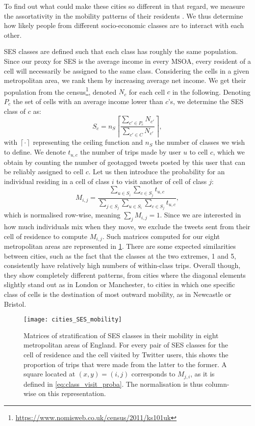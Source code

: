 \documentclass[../thesis.tex]{subfiles}
\begin{document}
To find out what could make these cities so different in that regard, we measure the
assortativity in the mobility patterns of their residents
\cite{HilmanSocioeconomicBiases2022}. We thus determine how likely people from different
socio-economic classes are to interact with each other.

\Ac{SES} classes are defined such that each class has roughly the same population. Since
our proxy for \ac{SES} is the average income in every \ac{MSOA}, every resident of a
cell will necessarily be assigned to the same class. Considering the cells in a given
metropolitan area, we rank them by increasing average net income. We get their
population from the
census\footnote{\url{https://www.nomisweb.co.uk/census/2011/ks101uk}}, denoted $N_c$ for
each cell $c$ in the following. Denoting $P_c$ the set of cells with an average income
lower than $c$'s, we determine the \ac{SES} class of $c$ as:
\begin{equation}
  S_c = n_S \left\lceil \frac{\sum_{c' \in P_c} N_{c'}}{\sum_{c' \in C} N_{c'}} \right\rceil,
\end{equation}
with $\left\lceil \cdot \right\rceil$ representing the ceiling function and $n_S$ the
number of classes we wish to define. We denote $t_{u, c}$ the number of trips made by
user $u$ to cell $c$, which we obtain by counting the number of geotagged tweets posted
by this user that can be reliably assigned to cell $c$. Let us then introduce the
probability for an individual residing in a cell of class $i$ to visit another of cell
of class $j$:
\begin{equation}
  \label{eq:class_visit_proba}
  M_{i, j} = \frac{
      \sum_{u \in S_i} \sum_{c \in S_j} t_{u, c}
    }{
      \sum_{j \in S_j} \sum_{u \in S_i} \sum_{c \in S_j} t_{u, c}
    },
\end{equation}
which is normalised row-wise, meaning $\sum_j M_{i, j} = 1$. Since we are interested in
how much individuals mix when they move, we exclude the tweets sent from their cell of
residence to compute $M_{i, j}$. Such matrices computed for our eight metropolitan areas
are represented in \cref{fig:cities_SES_mobility}. There are some expected similarities
between cities, such as the fact that the classes at the two extremes, 1 and 5,
consistently have relatively high numbers of within-class trips. Overall though, they
show completely different patterns, from cities where the diagonal elements slightly
stand out as in London or Manchester, to cities in which one specific class of cells is
the destination of most outward mobility, as in Newcastle or Bristol. 
\begin{figure}
\centering
  \texttt{[image: cities\_SES\_mobility]}
  \caption{ Matrices of stratification of \ac{SES} classes in their mobility in eight
  metropolitan areas of England. For every pair of \ac{SES} classes for the cell of
  residence and the cell visited by Twitter users, this shows the proportion of trips
  that were made from the latter to the former. A square located at $(x, y) = (i, j)$
  corresponds to $M_{j, i}$, as it is defined in \cref{eq:class_visit_proba}. The
  normalisation is thus column-wise on this representation.}
  \label{fig:cities_SES_mobility}
\end{figure}
\end{document}
